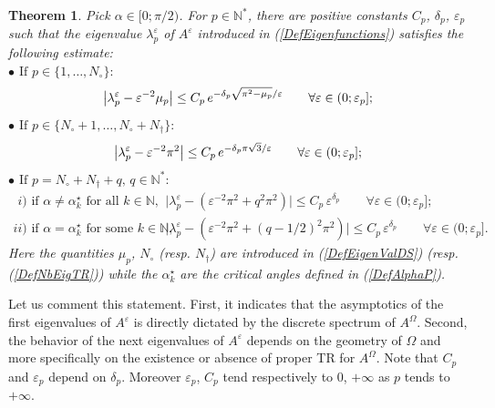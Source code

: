 \documentclass[11pt,a4paper]{article}
\newcommand{\eps}{\varepsilon}
\newcommand{\Om}{\Omega}
\newcommand{\N}{\mathbb{N}}
\newtheorem{theorem}{Theorem}[section]
\begin{document}
\begin{theorem}\label{MainThm1}
Pick $\alpha\in[0;\pi/2)$. For $p\in\N^\ast$, there are positive constants $C_p$, $\delta_p$, $\eps_p$ such that the eigenvalue $\lambda^\eps_p$ of $A^\eps$ introduced in (\ref{DefEigenfunctions}) satisfies the following estimate:\\[6pt]
$\bullet$ $\mbox{If }p\in\{1,\dots,N_\circ\}:$
\begin{equation}\label{result_thm_1}
\big|\lambda^\eps_p-\eps^{-2}\mu_p\big| \le C_p\,e^{-\delta_p\sqrt{\pi^2-\mu_p}/\eps}\qquad\forall\eps\in(0;\eps_p];\\[4pt]
\end{equation}
$\bullet$ $\mbox{If }p\in\{N_\circ+1,\dots,N_\circ+N_\dagger\}:$
\[
\big|\lambda^\eps_p-\eps^{-2}\pi^2\big| \le C_p\,e^{-\delta_p\pi\sqrt{3}/\eps}\qquad\forall\eps\in(0;\eps_p];\\[4pt]
\]
$\bullet$ $\mbox{If }p=N_\circ+N_\dagger+q,\,q\in\N^{\ast}:$
\begin{equation}\label{result_thm_3}
\begin{array}{ll}
\phantom{i}i)\mbox{ if }\alpha\ne\alpha_k^\star\mbox{ for all }k\in\N, & \big|\lambda^\eps_p-(\eps^{-2}\pi^2+q^2\pi^2)\big|\le C_p\,\eps^{\delta_p}\qquad\forall\eps\in(0;\eps_p];\\[10pt]
\phantom{}ii)\mbox{ if }\alpha=\alpha_k^\star\mbox{ for some }k\in\N, &  \big|\lambda^\eps_p-(\eps^{-2}\pi^2+(q-1/2)^2\pi^2)\big|\le C_p\,\eps^{\delta_p}\qquad\forall\eps\in(0;\eps_p].
\end{array}
\end{equation}
Here the quantities $\mu_p$, $N_\circ$ (resp. $N_\dagger$) are introduced in (\ref{DefEigenValDS}) (resp. (\ref{DefNbEigTR})) while the $\alpha^\star_k$ are the critical angles defined in (\ref{DefAlphaP}).
\end{theorem}
\noindent Let us comment this statement. First, it indicates that the asymptotics of the first eigenvalues of $A^\eps$ is directly dictated by the discrete spectrum of $A^\Om$. Second, the behavior of the next eigenvalues of $A^\eps$ depends on the geometry of $\Om$ and more specifically on the existence or absence of proper TR for $A^\Om$. Note that $C_p$ and $\eps_p$ depend on $\delta_p$. Moreover $\eps_p$, $C_p$ tend respectively to $0$, $+\infty$ as $p$ tends to $+\infty$.
\end{document}
